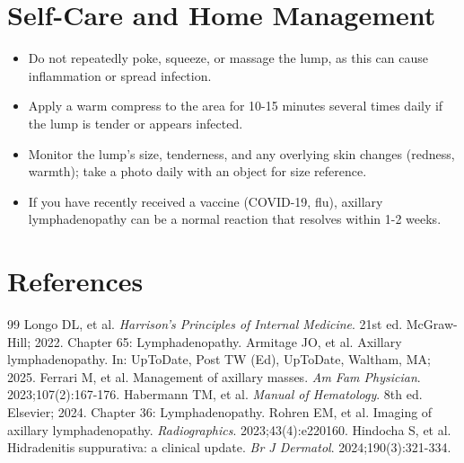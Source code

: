 \section*{Self-Care and Home Management}
\begin{itemize}
  \item Do not repeatedly poke, squeeze, or massage the lump, as this can cause inflammation or spread infection.
  \item Apply a warm compress to the area for 10-15 minutes several times daily if the lump is tender or appears infected.
  \item Monitor the lump's size, tenderness, and any overlying skin changes (redness, warmth); take a photo daily with an object for size reference.
  \item If you have recently received a vaccine (COVID-19, flu), axillary lymphadenopathy can be a normal reaction that resolves within 1-2 weeks.
\end{itemize}

\section*{References}

\begin{thebibliography}{99}
 Longo DL, et al. \emph{Harrison's Principles of Internal Medicine}. 21st ed. McGraw-Hill; 2022. Chapter 65: Lymphadenopathy.
 Armitage JO, et al. Axillary lymphadenopathy. In: UpToDate, Post TW (Ed), UpToDate, Waltham, MA; 2025.
 Ferrari M, et al. Management of axillary masses. \emph{Am Fam Physician}. 2023;107(2):167-176.
 Habermann TM, et al. \emph{Manual of Hematology}. 8th ed. Elsevier; 2024. Chapter 36: Lymphadenopathy.
 Rohren EM, et al. Imaging of axillary lymphadenopathy. \emph{Radiographics}. 2023;43(4):e220160.
 Hindocha S, et al. Hidradenitis suppurativa: a clinical update. \emph{Br J Dermatol}. 2024;190(3):321-334.
\end{thebibliography}
